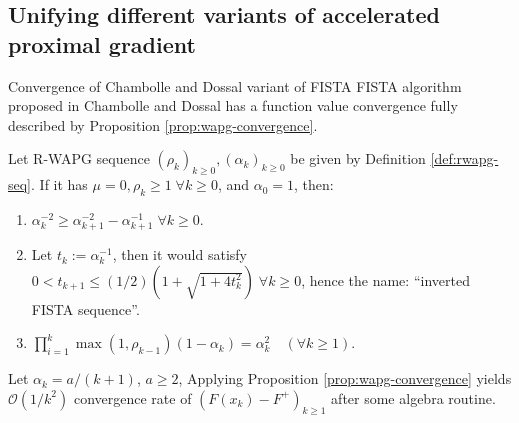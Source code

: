 \documentclass[11pt]{beamer}
\theoremstyle{definition}
\begin{document}
    \subsection{Unifying different variants of accelerated proximal gradient}
        \begin{frame}{Convergence of Chambolle and Dossal variant of FISTA}
            FISTA algorithm proposed in Chambolle and Dossal \cite{chambolle_convergence_2015} has a function value convergence fully described by Proposition \ref{prop:wapg-convergence}. 
            \begin{lemma}\label{lemma:inverted-fista-seq}
                Let R-WAPG sequence $(\rho_k)_{k \ge 0}, (\alpha_k)_{k \ge 0}$ be given by Definition \ref{def:rwapg-seq}.
                If it has $\mu = 0, \rho_k \ge 1\; \forall k \ge 0$, and $\alpha_0 = 1$, then:
                \begin{enumerate}
                    \item $\alpha_k^{-2} \ge \alpha_{k + 1}^{-2} - \alpha_{k + 1}^{-1}\; \forall k \ge 0$. 
                    \item Let $t_k := \alpha_k^{-1}$, then it would satisfy $0 < t_{k + 1} \le (1/2)\left(1 + \sqrt{1 + 4t_k^2}\right)\;\forall k\ge 0$, hence the name: ``inverted FISTA sequence''.
                    \item $\prod_{i = 1}^k\max(1, \rho_{k - 1})(1 - \alpha_k) = \alpha_k^2 \quad (\forall k \ge 1)$.
                \end{enumerate}
            \end{lemma}
            Let $\alpha_k = a/(k + 1)$, $a \ge 2$, Applying Proposition \ref{prop:wapg-convergence} yields $\mathcal O(1/k^2)$ convergence rate of $(F(x_k) - F^+)_{k \ge 1}$ after some algebra routine. 
        \end{frame}
\end{document}
